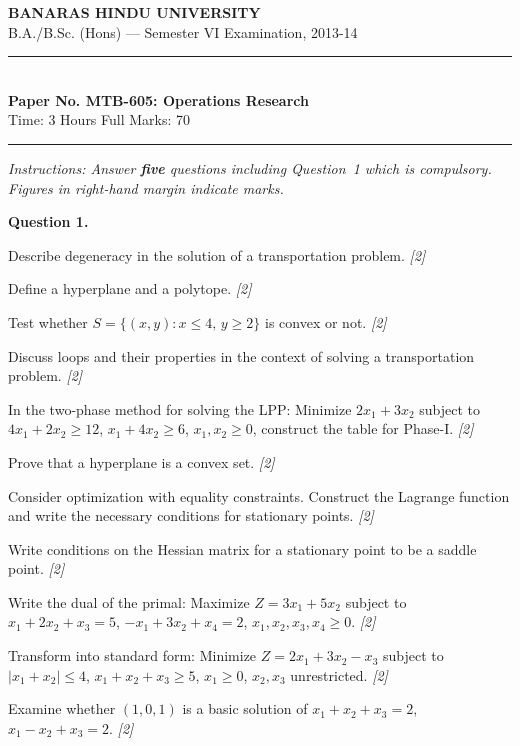 \documentclass[11pt,a4paper]{article}
\newcommand{\pts}[1]{\hfill   \textit{[#1]}}
\begin{document}
\begin{center}
  {\large\bfseries BANARAS HINDU UNIVERSITY}\\[2pt]
  {\normalsize B.A./B.Sc. (Hons) --- Semester VI Examination, 2013-14}\\[6pt]
  \rule{0.8\linewidth}{0.5pt}\\[6pt]
  {\large\bfseries Paper No. MTB-605: Operations Research}\\[4pt]
  {\normalsize Time: 3 Hours \hfill Full Marks: 70}
\end{center}
\rule{\linewidth}{0.4pt}
\smallskip



\noindent   \textit{Instructions: Answer   \textbf{five} questions including Question~1 which is compulsory. Figures in right-hand margin indicate marks.}
\bigskip




\noindent   \textbf{Question 1.}

\begin{parts}
  \item Describe degeneracy in the solution of a transportation problem. \pts{2}
  \item Define a hyperplane and a polytope. \pts{2}
  \item Test whether $S = \{(x,y): x \le 4,\, y \ge 2\}$ is convex or not. \pts{2}
  \item Discuss loops and their properties in the context of solving a transportation problem. \pts{2}
  \item In the two-phase method for solving the LPP: Minimize $2x_1 + 3x_2$ subject to $4x_1 + 2x_2 \ge 12$, $x_1 + 4x_2 \ge 6$, $x_1, x_2 \ge 0$, construct the table for Phase-I. \pts{2}
  \item Prove that a hyperplane is a convex set. \pts{2}
  \item Consider optimization with equality constraints. Construct the Lagrange function and write the necessary conditions for stationary points. \pts{2}
  \item Write conditions on the Hessian matrix for a stationary point to be a saddle point. \pts{2}
  \item Write the dual of the primal: Maximize $Z = 3x_1 + 5x_2$ subject to $x_1 + 2x_2 + x_3 = 5$, $-x_1 + 3x_2 + x_4 = 2$, $x_1, x_2, x_3, x_4 \ge 0$. \pts{2}
  \item Transform into standard form: Minimize $Z = 2x_1 + 3x_2 - x_3$ subject to $|x_1 + x_2| \le 4$, $x_1 + x_2 + x_3 \ge 5$, $x_1 \ge 0$, $x_2, x_3$ unrestricted. \pts{2}
  \item Examine whether $(1, 0, 1)$ is a basic solution of $x_1 + x_2 + x_3 = 2$, $x_1 - x_2 + x_3 = 2$. \pts{2}
\end{parts}
\end{document}
